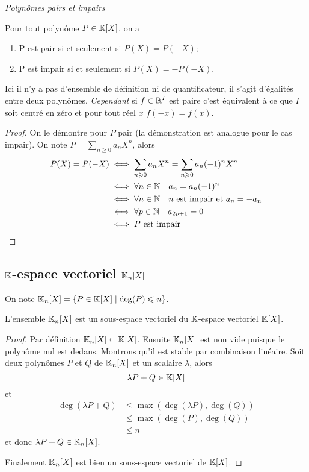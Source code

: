 \emph{Polynômes pairs et impairs}

\begin{prop}
  Pour tout polynôme \(P \in \mathbb{K}[X]\), on a
  \begin{enumerate}
    \item P est pair si et seulement si \(P(X)=P(-X)\);
    \item P est impair si et seulement si \(P(X)=-P(-X)\).
  \end{enumerate}
\end{prop}

\danger Ici il n'y a pas d'ensemble de définition ni de quantificateur, il s'agit d'égalités entre deux polynômes. \emph{Cependant} si \(f \in \mathbb{R}^I\) est paire c'est équivalent à ce que \(I\) soit centré en zéro et pour tout réel \(x\) \(f(-x)=f(x)\).

\begin{proof}
  On le démontre pour \(P\) pair (la démonstration est analogue pour le cas impair). On note \(P = \sum_{n\geqslant 0} a_n X^n\), alors
  \begin{align}
    P(X) = P(-X) &\iff \sum_{n \geqslant 0} a_n X^n = \sum_{n \geqslant 0} a_n (-1)^n X^n\\
                 &\iff \forall n \in \mathbb{N} \quad a_n=a_n(-1)^n\\
                 &\iff \forall n \in \mathbb{N} \quad n \text{~est impair et~} a_n=-a_n\\
                 &\iff \forall p \in \mathbb{N} \quad a_{2p+1}=0\\
                 &\iff P \text{~est impair}
  \end{align}
\end{proof}

\subsection{\(\mathbb{K}\)-espace vectoriel \(\mathbb{K}_n[X]\)}

On note \(\mathbb{K}_n[X]=\left\{P \in \mathbb{K}[X]\mathrel{}\middle|\mathrel{}\deg(P) \leqslant n\right\}\).

\begin{prop}
  L'ensemble \(\mathbb{K}_n[X]\) est un sous-espace vectoriel du \(\mathbb{K}\)-espace vectoriel \(\mathbb{K}[X]\).
\end{prop}
\begin{proof}
  Par définition \(\mathbb{K}_n[X] \subset \mathbb{K}[X]\). Ensuite \(\mathbb{K}_n[X]\) est non vide puisque le polynôme nul est dedans. Montrons qu'il est stable par combinaison linéaire. Soit deux polynômes \(P\) et \(Q\) de \(\mathbb{K}_n[X]\) et un scalaire \(\lambda\), alors
  \begin{equation}
    \lambda P +Q \in \mathbb{K}[X]
  \end{equation}
  et
  \begin{align}
    \deg(\lambda P+Q) &\leqslant \max(\deg(\lambda P),\deg(Q))\\
                      &\leqslant \max(\deg(P),\deg(Q))\\
                      &\leqslant n
  \end{align}
  et donc \(\lambda P +Q \in \mathbb{K}_n[X]\).

  Finalement \(\mathbb{K}_n[X]\) est bien un sous-espace vectoriel de \(\mathbb{K}[X]\). 
\end{proof}

